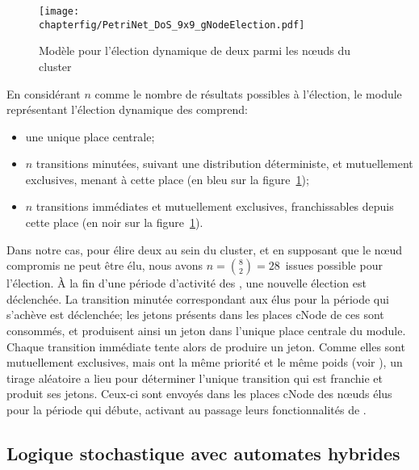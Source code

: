 \begin{figure}[ht]
    \centering
    \texttt{[image: \\chapterfig/PetriNet\_DoS\_9x9\_gNodeElection.pdf]}
    \caption{Modèle \rpsge pour l'élection dynamique de deux \cns parmi les nœuds du cluster}\label{sa:fig:petrielec}
\end{figure}
En considérant $n$ comme le nombre de résultats possibles à l'élection, le module représentant l'élection dynamique des \cns comprend:
\begin{itemize}
    \item une unique place centrale;
    \item $n$ transitions minutées, suivant une distribution déterministe, et mutuellement exclusives, menant à cette place (en bleu sur la figure~\ref{sa:fig:petrielec});
    \item $n$ transitions immédiates et mutuellement exclusives, franchissables depuis cette place (en noir sur la figure~\ref{sa:fig:petrielec}).
\end{itemize}
Dans notre cas, pour élire deux \cns au sein du cluster, et en supposant que le nœud compromis ne peut être élu, nous avons $n=\binom{8}{2}=28$~issues possible pour l'élection.
À la fin d'une période d'activité des \cns, une nouvelle élection est déclenchée.
La transition minutée correspondant aux \cns élus pour la période qui s'achève est déclenchée; les jetons présents dans les places \textsf{cNode} de ces \cns sont consommés, et produisent ainsi un jeton dans l'unique place centrale du module.
Chaque transition immédiate tente alors de produire un jeton.
Comme elles sont mutuellement exclusives, mais ont la même priorité et le même poids (voir ), un tirage aléatoire a lieu pour déterminer l'unique transition qui est franchie et produit ses jetons.
Ceux-ci sont envoyés dans les places \textsf{cNode} des nœuds élus pour la période qui débute, activant au passage leurs fonctionnalités de \cns.
    \subsection{Logique stochastique avec automates hybrides}

